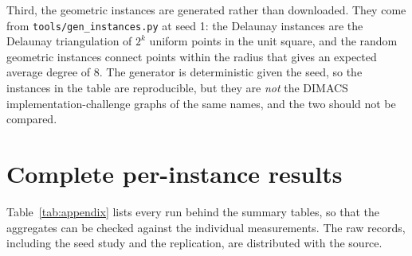 \documentclass[preprint,authoryear,11pt]{elsarticle}
\theoremstyle{definition}
\begin{document}
Third, the geometric instances are generated rather than downloaded. They come
from \texttt{tools/gen\_instances.py} at seed 1: the Delaunay instances are the
Delaunay triangulation of $2^{k}$ uniform points in the unit square, and the
random geometric instances connect points within the radius that gives an
expected average degree of 8. The generator is deterministic given the seed, so
the instances in the table are reproducible, but they are \emph{not} the DIMACS
implementation-challenge graphs of the same names, and the two should not be
compared.



\setcounter{table}{0}
\section{Complete per-instance results}
\label{app:full}

Table~\ref{tab:appendix} lists every run behind the summary tables, so that the
aggregates can be checked against the individual measurements. The raw records,
including the seed study and the replication, are distributed with the source.






\end{document}
